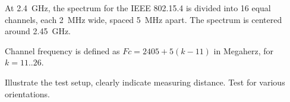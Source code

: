 At \SI{2.4}{GHz}, the spectrum for the IEEE 802.15.4 is divided into 16 equal
channels, each \SI{2}{MHz} wide, spaced \SI{5}{MHz} apart. The spectrum is
centered around \SI{2.45}{GHz}.\citep[pg. 29]{ieee802154}

Channel frequency is defined as $Fc = 2405 + 5 (k-11)$ in Megaherz, for $k
= 11..26$.

Illustrate the test setup, clearly indicate measuring distance. Test for various
orientations.


